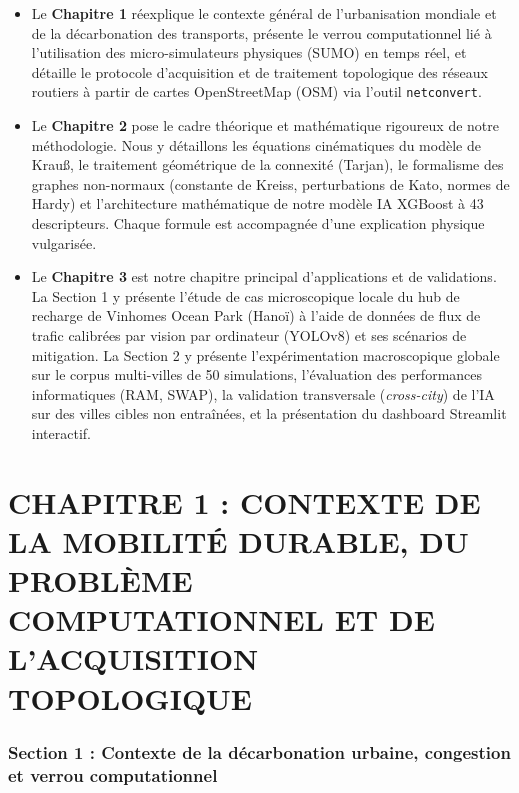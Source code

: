 \documentclass[10pt, a4paper]{article}
\providecommand{\tightlist}{}
\begin{document}
\begin{itemize}
\tightlist
\item
  Le \textbf{Chapitre 1} réexplique le contexte général de
  l'urbanisation mondiale et de la décarbonation des transports,
  présente le verrou computationnel lié à l'utilisation des
  micro-simulateurs physiques (SUMO) en temps réel, et détaille le
  protocole d'acquisition et de traitement topologique des réseaux
  routiers à partir de cartes OpenStreetMap (OSM) via l'outil
  \texttt{netconvert}.
\item
  Le \textbf{Chapitre 2} pose le cadre théorique et mathématique
  rigoureux de notre méthodologie. Nous y détaillons les équations
  cinématiques du modèle de Krauß, le traitement géométrique de la
  connexité (Tarjan), le formalisme des graphes non-normaux (constante
  de Kreiss, perturbations de Kato, normes de Hardy) et l'architecture
  mathématique de notre modèle IA XGBoost à 43 descripteurs. Chaque
  formule est accompagnée d'une explication physique vulgarisée.
\item
  Le \textbf{Chapitre 3} est notre chapitre principal d'applications et
  de validations. La Section 1 y présente l'étude de cas microscopique
  locale du hub de recharge de Vinhomes Ocean Park (Hanoï) à l'aide de
  données de flux de trafic calibrées par vision par ordinateur (YOLOv8)
  et ses scénarios de mitigation. La Section 2 y présente
  l'expérimentation macroscopique globale sur le corpus multi-villes de
  50 simulations, l'évaluation des performances informatiques (RAM,
  SWAP), la validation transversale (\emph{cross-city}) de l'IA sur des
  villes cibles non entraînées, et la présentation du dashboard
  Streamlit interactif.
\end{itemize}

\newpage

\section{CHAPITRE 1 : CONTEXTE DE LA MOBILITÉ DURABLE, DU PROBLÈME
COMPUTATIONNEL ET DE L'ACQUISITION
TOPOLOGIQUE}\label{chapitre-1-contexte-de-la-mobilituxe9-durable-du-probluxe8me-computationnel-et-de-lacquisition-topologique}

\subsubsection{Section 1 : Contexte de la décarbonation urbaine,
congestion et verrou
computationnel}\label{section-1-contexte-de-la-duxe9carbonation-urbaine-congestion-et-verrou-computationnel}
\end{document}
